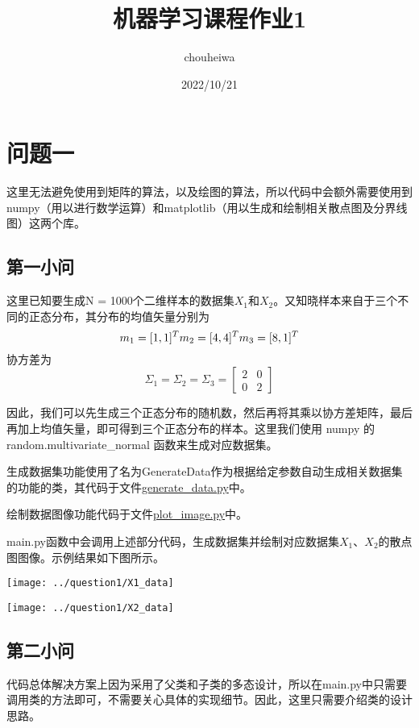 \documentclass[UTF8]{article} %
\title{机器学习课程作业1}
\author{chouheiwa}
\date{2022/10/21}
\begin{document}
    \maketitle
    \tableofcontents


    \section{问题一}
    这里无法避免使用到矩阵的算法，以及绘图的算法，所以代码中会额外需要使用到numpy（用以进行数学运算）和matplotlib（用以生成和绘制相关散点图及分界线图）这两个库。

    \subsection{第一小问}
    这里已知要生成N = 1000个二维样本的数据集$X_1$和$X_2$。又知晓样本来自于三个不同的正态分布，其分布的均值矢量分别为
    \[
        m_1 = [1, 1]^T\\m_2 = [4, 4]^T\\m_3 = [8, 1]^T
    \]
    协方差为
    \[
        \Sigma_1 = \Sigma_2 = \Sigma_3 = \begin{bmatrix}
                                             2 & 0 \\ 0 & 2
        \end{bmatrix}
    \]

    因此，我们可以先生成三个正态分布的随机数，然后再将其乘以协方差矩阵，最后再加上均值矢量，即可得到三个正态分布的样本。这里我们使用 numpy 的 random.multivariate\_normal 函数来生成对应数据集。

    生成数据集功能使用了名为GenerateData作为根据给定参数自动生成相关数据集的功能的类，其代码于文件\href{run:generate_data.py}{generate\_data.py}中。

    绘制数据图像功能代码于文件\href{run:plot_image.py}{plot\_image.py}中。

    main.py函数中会调用上述部分代码，生成数据集并绘制对应数据集$X_1$、$X_2$的散点图图像。示例结果如下图所示。


    \begin{minipage}[t]{0.5\linewidth}
        \centering
        \texttt{[image: ../question1/X1\_data]}
    \end{minipage}%
    \begin{minipage}[t]{0.5\linewidth}
        \centering
        \texttt{[image: ../question1/X2\_data]}
    \end{minipage}

    \subsection{第二小问} \label{sec:question1_2}
    代码总体解决方案上因为采用了父类和子类的多态设计，所以在main.py中只需要调用类的方法即可，不需要关心具体的实现细节。因此，这里只需要介绍类的设计思路。
\end{document}
